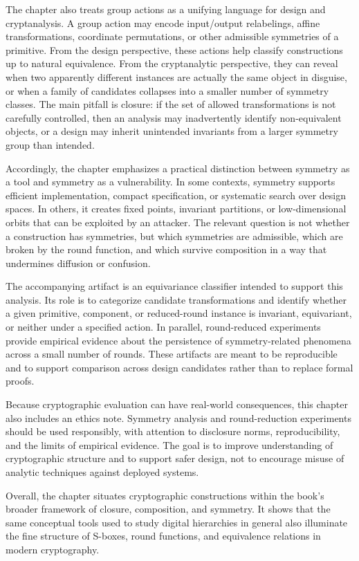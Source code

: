 \documentclass[11pt]{article}
\begin{document}
The chapter also treats group actions as a unifying language for design and cryptanalysis. A group action may encode input/output relabelings, affine transformations, coordinate permutations, or other admissible symmetries of a primitive. From the design perspective, these actions help classify constructions up to natural equivalence. From the cryptanalytic perspective, they can reveal when two apparently different instances are actually the same object in disguise, or when a family of candidates collapses into a smaller number of symmetry classes. The main pitfall is closure: if the set of allowed transformations is not carefully controlled, then an analysis may inadvertently identify non-equivalent objects, or a design may inherit unintended invariants from a larger symmetry group than intended.

Accordingly, the chapter emphasizes a practical distinction between symmetry as a tool and symmetry as a vulnerability. In some contexts, symmetry supports efficient implementation, compact specification, or systematic search over design spaces. In others, it creates fixed points, invariant partitions, or low-dimensional orbits that can be exploited by an attacker. The relevant question is not whether a construction has symmetries, but which symmetries are admissible, which are broken by the round function, and which survive composition in a way that undermines diffusion or confusion.

The accompanying artifact is an equivariance classifier intended to support this analysis. Its role is to categorize candidate transformations and identify whether a given primitive, component, or reduced-round instance is invariant, equivariant, or neither under a specified action. In parallel, round-reduced experiments provide empirical evidence about the persistence of symmetry-related phenomena across a small number of rounds. These artifacts are meant to be reproducible and to support comparison across design candidates rather than to replace formal proofs.

Because cryptographic evaluation can have real-world consequences, this chapter also includes an ethics note. Symmetry analysis and round-reduction experiments should be used responsibly, with attention to disclosure norms, reproducibility, and the limits of empirical evidence. The goal is to improve understanding of cryptographic structure and to support safer design, not to encourage misuse of analytic techniques against deployed systems.

Overall, the chapter situates cryptographic constructions within the book's broader framework of closure, composition, and symmetry. It shows that the same conceptual tools used to study digital hierarchies in general also illuminate the fine structure of S-boxes, round functions, and equivalence relations in modern cryptography.
\end{document}
